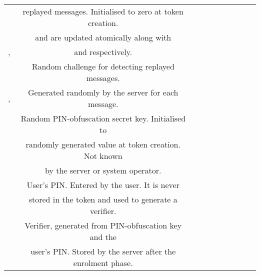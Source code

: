 \begin{table}[!h]
\begin{scriptsize}
{{\begin{tabular}{|c|c|c|c|c|c|c|c|c|c|}
    \cellcolor{white!20}\scriptsize &\cellcolor{white!20}\scriptsize   replayed messages.  Initialised to zero at token creation.\\ 

\cellcolor{white!20}\scriptsize &\cellcolor{white!20}\scriptsize  \VC{\counter} and \VS{\counter} are updated atomically along with\\ 

\multirow{-4}{*}{\cellcolor{white!20}\scriptsize  \VC{\counter}, \VS{\counter}  }&\cellcolor{white!20}\scriptsize  \VC{\state} and \VS{\state} respectively.\\   



\cellcolor{gray!20}\scriptsize &\cellcolor{gray!20}\scriptsize   Random challenge for detecting replayed messages.\\ 

\multirow{-2}{*}{\cellcolor{gray!20}\scriptsize   \VS{\nonce}, \VM{\nonce}  }&\cellcolor{gray!20}\scriptsize  Generated randomly by the server for each message.\\   



\cellcolor{white!20}\scriptsize &\cellcolor{white!20}\scriptsize   Random PIN-obfuscation secret key. Initialised to\\ 


\cellcolor{white!20}\scriptsize &\cellcolor{white!20}\scriptsize   randomly generated value at token creation. Not known \\ 


\multirow{-3}{*}{\cellcolor{white!20}\scriptsize  \VC{\salt}}&\cellcolor{white!20}\scriptsize  by  the server or system operator.\\   



\cellcolor{gray!20}\scriptsize &\cellcolor{gray!20}\scriptsize   User's PIN.  Entered by the user. It is never \\ 


\multirow{-2}{*}{\cellcolor{gray!20}\scriptsize  \VC{\pin}}&\cellcolor{gray!20}\scriptsize  stored in the token and used to generate a verifier.\\   

      
  \cellcolor{white!20}\scriptsize &\cellcolor{white!20}\scriptsize   Verifier, generated from PIN-obfuscation key and the\\ 


\cellcolor{white!20}\scriptsize &\cellcolor{white!20}\scriptsize   user's PIN.  Stored by the server after the enrolment phase. \\ 



\end{tabular}}}
\end{scriptsize}
\end{table}
